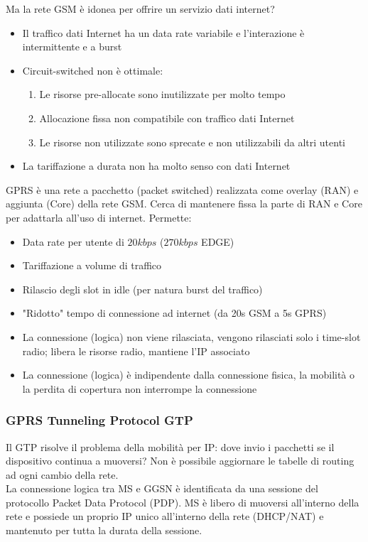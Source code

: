 Ma la rete GSM è idonea per offrire un servizio dati internet? 
\begin{itemize}
	\item Il traffico dati Internet ha un data rate variabile e l'interazione è intermittente e a burst
	\item Circuit-switched non è ottimale:
	\begin{enumerate}
		\item Le risorse pre-allocate sono inutilizzate per molto tempo
		\item Allocazione fissa non compatibile con traffico dati Internet
		\item Le risorse non utilizzate sono sprecate e non utilizzabili da altri utenti
	\end{enumerate}
	\item La tariffazione a durata non ha molto senso con dati Internet
\end{itemize}

GPRS è una rete a pacchetto (packet switched) realizzata come overlay (RAN) e aggiunta (Core) della rete GSM. Cerca di mantenere fissa la parte di RAN e Core per adattarla all'uso di internet. Permette: 
\begin{itemize}
	\item Data rate per utente di $20kbps$ ($270kbps$ EDGE)
	\item Tariffazione a volume di traffico
	\item Rilascio degli slot in idle (per natura burst del traffico)
	\item "Ridotto" tempo di connessione ad internet (da 20s GSM a 5s GPRS)
	\item La connessione (logica) non viene rilasciata, vengono rilasciati solo i time-slot radio; libera le risorse radio, mantiene l'IP associato
	\item La connessione (logica) è indipendente dalla connessione fisica, la mobilità o la perdita di copertura non interrompe la connessione
\end{itemize}

\subsubsection{GPRS Tunneling Protocol GTP}

Il GTP risolve il problema della mobilità per IP: dove invio i pacchetti se il dispositivo continua a muoversi? Non è possibile aggiornare le tabelle di routing ad ogni cambio della rete.\\
La connessione logica tra MS e GGSN è identificata da una sessione del protocollo Packet Data Protocol (PDP). MS è libero di muoversi all'interno della rete e possiede un proprio IP unico all'interno della rete (DHCP/NAT) e mantenuto per tutta la durata della sessione.\\

